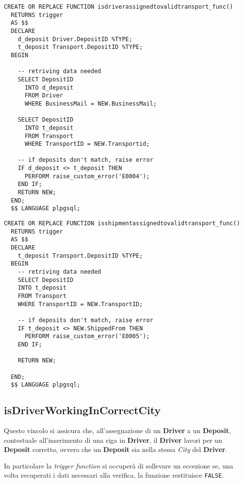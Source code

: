 \begin{lstlisting}[caption={Funzione per il vincolo \textbf{isDriverAssignedToValidTransport}}]
  CREATE OR REPLACE FUNCTION isdriverassignedtovalidtransport_func() 
  RETURNS trigger
  AS $$
  DECLARE
    d_deposit Driver.DepositID %TYPE;
    t_deposit Transport.DepositID %TYPE;
  BEGIN

    -- retriving data needed
    SELECT DepositID
      INTO d_deposit
      FROM Driver
      WHERE BusinessMail = NEW.BusinessMail;

    SELECT DepositID
      INTO t_deposit
      FROM Transport
      WHERE TransportID = NEW.Transportid;

    -- if deposits don't match, raise error
    IF d_deposit <> t_deposit THEN
      PERFORM raise_custom_error('E0004');
    END IF;
    RETURN NEW;
  END;
  $$ LANGUAGE plpgsql;
\end{lstlisting}
\newpage
\begin{lstlisting}[caption={Funzione per il vincolo \textbf{isShipmentAssignedToValidTransport}}]
  CREATE OR REPLACE FUNCTION isshipmentassignedtovalidtransport_func() 
  RETURNS trigger
  AS $$
  DECLARE
    t_deposit Transport.DepositID %TYPE;
  BEGIN
    -- retriving data needed
    SELECT DepositID
    INTO t_deposit
    FROM Transport
    WHERE TransportID = NEW.TransportID;

    -- if deposits don't match, raise error
    IF t_deposit <> NEW.ShippedFrom THEN
      PERFORM raise_custom_error('E0005');
    END IF;

    RETURN NEW;

  END;
  $$ LANGUAGE plpgsql;
\end{lstlisting}

\subsection{\textbf{isDriverWorkingInCorrectCity}}

Questo vincolo si assicura che, all'assegnazione di un \textbf{Driver} a un \textbf{Deposit}, contestuale all'inserimento di una riga in \textbf{Driver}, il \textbf{Driver} lavori per un \textbf{Deposit} corretto, ovvero che un \textbf{Deposit} sia nella stessa \textit{City} del \textbf{Driver}.

In particolare la \textit{trigger function} si occuperà di sollevare un eccezione se, una volta recuperati i dati necessari alla verifica, la funzione  restituisce \lstinline{FALSE}.

